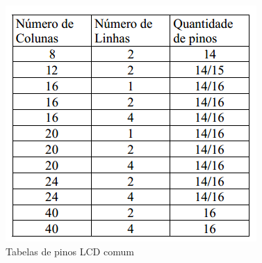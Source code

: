 \begin{figure}[htp]
	\centering
	\includegraphics[scale=1]{images/tabelas_pinos_lcd.png}
	\caption{Tabelas de pinos LCD comum}	
	\label{fig:pinoslcd}	
\end{figure}
